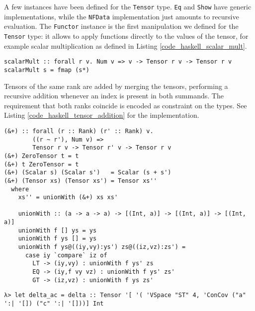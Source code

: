 A few instances have been defined for the \texttt{Tensor} type. \texttt{Eq} and \texttt{Show} have generic implementations, while the \texttt{NFData} implementation just amounts to recursive evaluation. The \texttt{Functor} instance is the first manipulation we defined for the \texttt{Tensor} type: it allows to apply functions directly to the values of the tensor, for example scalar multiplication as defined in Listing \ref{code_haskell_scalar_mult}.
\begin{code}
  \begin{verbatim}
scalarMult :: forall r v. Num v => v -> Tensor r v -> Tensor r v
scalarMult s = fmap (s*)
  \end{verbatim}
  \label{code_haskell_scalar_mult}
\end{code}
Tensors of the same rank are added by merging the tensors, performing a recursive addition whenever an index is present in both summands. The requirement that both ranks coincide is encoded as constraint on the types. See Listing \ref{code_haskell_tensor_addition} for the implementation.
\begin{code}
  \begin{verbatim}
(&+) :: forall (r :: Rank) (r' :: Rank) v.
        ((r ~ r'), Num v) =>
        Tensor r v -> Tensor r' v -> Tensor r v
(&+) ZeroTensor t = t
(&+) t ZeroTensor = t
(&+) (Scalar s) (Scalar s')   = Scalar (s + s')
(&+) (Tensor xs) (Tensor xs') = Tensor xs''
  where
    xs'' = unionWith (&+) xs xs'

    unionWith :: (a -> a -> a) -> [(Int, a)] -> [(Int, a)] -> [(Int, a)]
    unionWith f [] ys = ys
    unionWith f ys [] = ys
    unionWith f ys@((iy,vy):ys') zs@((iz,vz):zs') =
      case iy `compare` iz of
        LT -> (iy,vy) : unionWith f ys' zs
        EQ -> (iy,f vy vz) : unionWith f ys' zs'
        GT -> (iz,vz) : unionWith f ys zs'
  \end{verbatim}
  \label{code_haskell_tensor_addition}
\end{code}
\begin{code}
  \begin{verbatim}
λ> let delta_ac = delta :: Tensor '[ '( 'VSpace "ST" 4, 'ConCov ("a" ':| '[]) ("c" ':| '[]))] Int
  \end{verbatim}
  \label{repl_addition}
\end{code}


